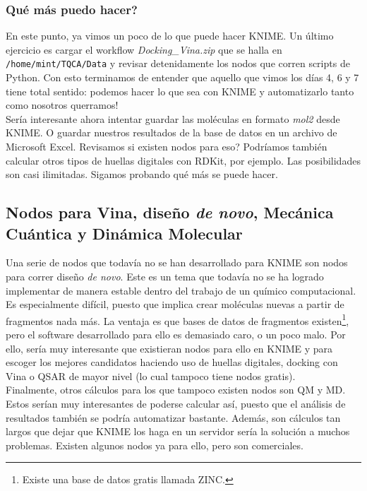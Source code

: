 \documentclass[10pt,letterpaper]{article}
\newcommand{\inlinecode}[1]{
\colorbox{light-gray}{\texttt{#1}}
}
\begin{document}
\subsubsection{Qu\'e m\'as puedo hacer?}
En este punto, ya vimos un poco de lo que puede hacer KNIME. Un \'ultimo ejercicio es cargar el workflow \textit{Docking\_Vina.zip} que se halla en \inlinecode{/home/mint/TQCA/Data} y revisar detenidamente los nodos que corren scripts de Python. Con esto terminamos de entender que aquello que vimos los d\'ias 4, 6 y 7 tiene total sentido: podemos hacer lo que sea con KNIME y automatizarlo tanto como nosotros querramos!\\

Ser\'ia interesante ahora intentar guardar las mol\'eculas en formato \emph{mol2} desde KNIME. O guardar nuestros resultados de la base de datos en un archivo de Microsoft Excel. Revisamos si existen nodos para eso? Podr\'iamos tambi\'en calcular otros tipos de huellas digitales con RDKit, por ejemplo. Las posibilidades son casi ilimitadas. Sigamos probando qu\'e m\'as se puede hacer.

\subsection{Nodos para Vina, dise\~no \emph{de novo}, Mec\'anica Cu\'antica y Din\'amica Molecular}
Una serie de nodos que todav\'ia no se han desarrollado para KNIME son nodos para correr dise\~no \emph{de novo}. Este es un tema que todav\'ia no se ha logrado implementar de manera estable dentro del trabajo de un qu\'imico computacional. Es especialmente dif\'icil, puesto que implica crear mol\'eculas nuevas a partir de fragmentos nada m\'as. La ventaja es que bases de datos de fragmentos existen\footnote{Existe una base de datos gratis llamada ZINC.}, pero el software desarrollado para ello es demasiado caro, o un poco malo. Por ello, ser\'ia muy interesante que existieran nodos para ello en KNIME y para escoger los mejores candidatos haciendo uso de huellas digitales, docking con Vina o QSAR de mayor nivel (lo cual tampoco tiene nodos gratis).\\

Finalmente, otros c\'alculos para los que tampoco existen nodos son QM y MD. Estos ser\'ian muy interesantes de poderse calcular as\'i, puesto que el an\'alisis de resultados tambi\'en se podr\'ia automatizar bastante. Adem\'as, son c\'alculos tan largos que dejar que KNIME los haga en un servidor ser\'ia la soluci\'on a muchos problemas. Existen algunos nodos ya para ello, pero son comerciales.
\end{document}
